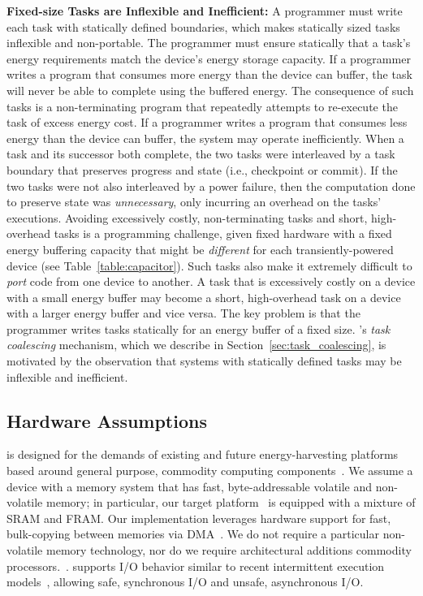 \noindent \textbf{Fixed-size Tasks are Inflexible and Inefficient:} A programmer must write each task with statically defined boundaries, which makes statically sized tasks inflexible and non-portable. The programmer must ensure statically that a task's energy requirements match the device's energy storage capacity. If a programmer writes a program that consumes more energy than the device can buffer, the task will never be able to complete using the buffered energy. The consequence of such tasks is a non-terminating program that repeatedly attempts to re-execute the task of excess energy cost. If a programmer writes a program that consumes less energy than the device can buffer, the system may operate inefficiently. When a task and its successor both complete, the two tasks were interleaved by a task boundary that preserves progress and state (i.e., checkpoint or commit).  If the two tasks were not also interleaved by a power failure, then the computation done to preserve state was {\em unnecessary}, only incurring an overhead on the tasks' executions. Avoiding excessively costly, non-terminating tasks and short, high-overhead tasks is a programming challenge, given fixed hardware with a fixed energy buffering capacity that might be \emph{different} for each transiently-powered device (see Table~\ref{table:capacitor}). Such tasks also make it extremely difficult to {\em port} code from  one device to another. A task that is excessively costly on a device with a small energy buffer may become a short, high-overhead task on a device with a larger energy buffer and vice versa. The key problem is that the programmer writes tasks statically for an energy buffer of a fixed size. \sys's {\em task coalescing} mechanism, which we describe in Section~\ref{sec:task_coalescing}, is motivated by the observation that systems with statically defined tasks may be inflexible and inefficient. 

\subsection{Hardware Assumptions}
\label{sec:background_hardware}

\sys is designed for the demands of existing and future energy-harvesting platforms based around general purpose, commodity computing components~\cite{wisp,msp430datasheet}. We assume a device with a memory system that has fast, byte-addressable volatile and non-volatile memory; in particular, our target platform~\cite{wisp} is equipped with a mixture of SRAM and FRAM. Our implementation leverages hardware support for fast, bulk-copying between memories via DMA~\cite{msp430datasheet}. We do not require a particular non-volatile memory technology, nor do we require architectural additions commodity processors.~\cite{su_date_2017,ratchet,quickrecall,nvp}. \sys supports I/O behavior similar to recent intermittent execution models~\cite{alpaca,chain}, allowing safe, synchronous I/O and unsafe, asynchronous I/O.